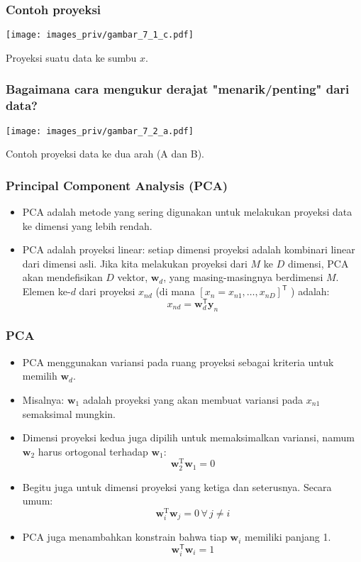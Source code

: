 \documentclass[bahasa,11pt,aspectratio=169]{beamer}
\begin{document}
\begin{frame}[fragile]
\frametitle{Contoh proyeksi}

\begin{center}
\texttt{[image: images\_priv/gambar\_7\_1\_c.pdf]}
\end{center}

Proyeksi suatu data ke sumbu $x$.

\end{frame}


\begin{frame}
\frametitle{Bagaimana cara mengukur derajat "menarik/penting" dari data?}

\begin{center}
\texttt{[image: images\_priv/gambar\_7\_2\_a.pdf]}
\end{center}

Contoh proyeksi data ke dua arah (A dan B).

\end{frame}



\begin{frame}
\frametitle{Principal Component Analysis (PCA)}

\begin{itemize}
\item PCA adalah metode yang sering digunakan untuk melakukan proyeksi data ke dimensi
yang lebih rendah.
\item PCA adalah proyeksi linear: setiap dimensi proyeksi adalah kombinari linear dari
dimensi asli. Jika kita melakukan proyeksi dari $M$ ke $D$ dimensi, PCA akan mendefisikan
$D$ vektor, $\mathbf{w}_{d}$, yang masing-masingnya berdimensi $M$. Elemen ke-$d$ dari
proyeksi $x_{nd}$ (di mana $[x_{n} = x_{n1},\ldots,x_{nD}]^{\mathsf{T}}$ ) adalah:
$$
x_{nd} = \mathbf{w}^{\mathsf{T}}_{d} \mathbf{y}_{n}
$$
\end{itemize}

\end{frame}


\begin{frame}
\frametitle{PCA}

\begin{itemize}
\item PCA menggunakan variansi pada ruang proyeksi sebagai kriteria untuk memilih
$\mathbf{w}_{d}$.
%
\item Misalnya: $\mathbf{w}_{1}$ adalah proyeksi yang akan membuat variansi pada $x_{n1}$ semaksimal mungkin.
%
\item Dimensi proyeksi kedua juga dipilih untuk memaksimalkan variansi, namum $\mathbf{w}_{2}$
harus ortogonal terhadap $\mathbf{w}_{1}$:
$$
\mathbf{w}_{2}^{\mathrm{T}} \mathbf{w}_{1} = 0
$$
%
\item Begitu juga untuk dimensi proyeksi yang ketiga dan seterusnya. Secara umum:
$$
\mathbf{w}_{i}^{\mathrm{T}} \mathbf{w}_{j} = 0 \, \forall\, j \neq i
$$
\item PCA juga menambahkan konstrain bahwa tiap $\mathbf{w}_{i}$ memiliki panjang 1.
$$
\mathbf{w}_{i}^{\mathsf{T}} \mathbf{w}_{i} = 1
$$

\end{itemize}

\end{frame}
\end{document}
